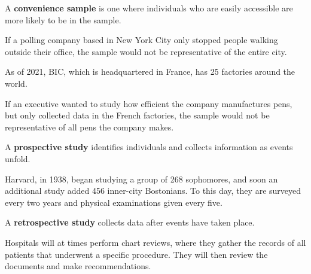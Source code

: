 \documentclass{beamer}
\begin{document}
\begin{frame}
\begin{definition}
A \textbf{convenience sample} is one where individuals who are easily accessible are more likely to be in the sample.
\end{definition}\pause

\begin{example}
If a polling company based in New York City only stopped people walking outside their office, the sample would not be representative of the entire city.
\end{example}\pause

\begin{example}
As of 2021, BIC, which is headquartered in France, has 25 factories around the world. 

\vspace{2mm}
If an executive wanted to study how efficient the company manufactures pens, but only collected data in the French factories, the sample would not be representative of all pens the company makes.
\end{example}
\end{frame}

\begin{frame}
\begin{definition}
A \textbf{prospective study} identifies individuals and collects information as events unfold.
\end{definition}\pause

\begin{example}
Harvard, in 1938, began studying a group of 268 sophomores, and soon an additional study added 456 inner-city Bostonians. To this day, they are surveyed every two years and physical examinations given every five.
\end{example}\pause

\begin{definition}
A \textbf{retrospective study} collects data after events have taken place.
\end{definition}\pause

\begin{example}
Hospitals will at times perform chart reviews, where they gather the records of all patients that underwent a specific procedure. They will then review the documents and make recommendations.
\end{example}
\end{frame}
\end{document}

